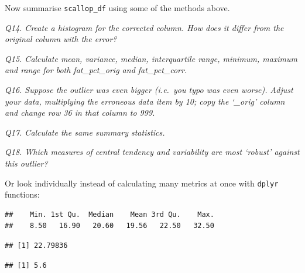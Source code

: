 \documentclass[
  11pt,
  a4paper,
]{book}
\newenvironment{Shaded}{\begin{snugshade}}{\end{snugshade}}
\newcommand{\FunctionTok}[1]{\textcolor[rgb]{0.00,0.00,0.00}{#1}}
\newcommand{\NormalTok}[1]{#1}
\newcommand{\SpecialCharTok}[1]{\textcolor[rgb]{0.00,0.00,0.00}{#1}}
\begin{document}
Now summarise \texttt{scallop\_df} using some of the methods above.

\emph{Q14. Create a histogram for the corrected column. How does it differ from the original column with the error?}

\emph{Q15. Calculate mean, variance, median, interquartile range, minimum, maximum and range for both fat\_pct\_orig and fat\_pct\_corr.}

\emph{Q16. Suppose the outlier was even bigger (i.e.~you typo was even worse). Adjust your data, multiplying the erroneous data item by 10; copy the `\_orig' column and change row 36 in that column to 999.}

\emph{Q17. Calculate the same summary statistics.}

\emph{Q18. Which measures of central tendency and variability are most `robust' against this outlier?}

Or look individually instead of calculating many metrics at once with \texttt{dplyr} functions:

\begin{Shaded}
\end{Shaded}

\begin{verbatim}
##    Min. 1st Qu.  Median    Mean 3rd Qu.    Max. 
##    8.50   16.90   20.60   19.56   22.50   32.50
\end{verbatim}

\begin{Shaded}
\end{Shaded}

\begin{verbatim}
## [1] 22.79836
\end{verbatim}

\begin{Shaded}
\end{Shaded}

\begin{verbatim}
## [1] 5.6
\end{verbatim}
\end{document}
